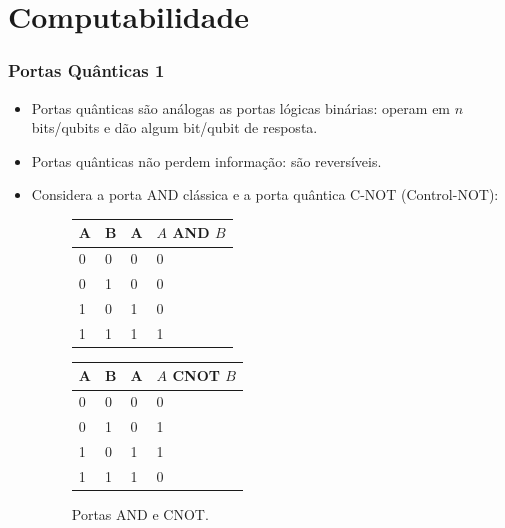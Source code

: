\documentclass{beamer}
\begin{document}
\section{Computabilidade}

\begin{frame}
\frametitle{Portas Quânticas 1}
\begin{itemize}
  \item Portas quânticas são análogas as portas lógicas binárias: operam
    em $n$ bits/qubits e dão algum bit/qubit de resposta.
  \item Portas quânticas não perdem informação: são reversíveis.
  \item Considera a porta AND clássica e a porta quântica C-NOT (Control-NOT):
    \begin{figure}[!htb]
    \label{andcnot}
    \begin{minipage}{.4\textwidth}
      \centering
      \begin{tabular}{|l l|ll|}
      \hline
      A & B & A & $A$ AND $B$  \\ \hline
      0 & 0 & 0 & 0            \\ \hline
      0 & 1 & 0 & 0            \\ \hline
      1 & 0 & 1 & 0            \\ \hline
      1 & 1 & 1 & 1            \\ \hline
      \end{tabular}
    \end{minipage}
    \begin{minipage}{0.4\textwidth}
      \centering
      \centering
      \begin{tabular}{|l l|ll|}
      \hline
      A & B & A & $A$ CNOT $B$ \\ \hline
      0 & 0 & 0 & 0            \\ \hline
      0 & 1 & 0 & 1            \\ \hline
      1 & 0 & 1 & 1            \\ \hline
      1 & 1 & 1 & 0            \\ \hline
      \end{tabular}
    \end{minipage}
      \caption{Portas AND e CNOT.}
    \end{figure}
\end{itemize}
\end{frame}
\end{document}
